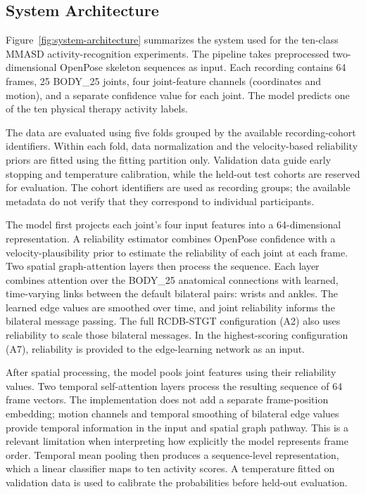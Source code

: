 \subsection{System Architecture}

Figure~\ref{fig:system-architecture} summarizes the system used for the ten-class MMASD activity-recognition experiments. The pipeline takes preprocessed two-dimensional OpenPose skeleton sequences as input. Each recording contains 64 frames, 25 BODY\_25 joints, four joint-feature channels (coordinates and motion), and a separate confidence value for each joint. The model predicts one of the ten physical therapy activity labels.

The data are evaluated using five folds grouped by the available recording-cohort identifiers. Within each fold, data normalization and the velocity-based reliability priors are fitted using the fitting partition only. Validation data guide early stopping and temperature calibration, while the held-out test cohorts are reserved for evaluation. The cohort identifiers are used as recording groups; the available metadata do not verify that they correspond to individual participants.

The model first projects each joint's four input features into a 64-dimensional representation. A reliability estimator combines OpenPose confidence with a velocity-plausibility prior to estimate the reliability of each joint at each frame. Two spatial graph-attention layers then process the sequence. Each layer combines attention over the BODY\_25 anatomical connections with learned, time-varying links between the default bilateral pairs: wrists and ankles. The learned edge values are smoothed over time, and joint reliability informs the bilateral message passing. The full RCDB-STGT configuration (A2) also uses reliability to scale those bilateral messages. In the highest-scoring configuration (A7), reliability is provided to the edge-learning network as an input.

After spatial processing, the model pools joint features using their reliability values. Two temporal self-attention layers process the resulting sequence of 64 frame vectors. The implementation does not add a separate frame-position embedding; motion channels and temporal smoothing of bilateral edge values provide temporal information in the input and spatial graph pathway. This is a relevant limitation when interpreting how explicitly the model represents frame order. Temporal mean pooling then produces a sequence-level representation, which a linear classifier maps to ten activity scores. A temperature fitted on validation data is used to calibrate the probabilities before held-out evaluation.

